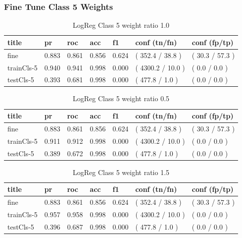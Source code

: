 \documentclass[ms]{nuthesis}
\begin{document}
\subsubsection{Fine Tune Class 5 Weights}
\FloatBarrier
\begin{table}[H]
\centering
\begin{tabular}{|l||l||l||l||l||l||l|}\toprule
title & pr & roc & acc & f1 & conf (tn/fn) & conf (fp/tp) \\ \midrule
fine & 0.883 & 0.861 & 0.856 & 0.624 & ( 352.4 / 38.8 ) & ( 30.3 / 57.3 ) \\
trainCls-5 & 0.940 & 0.941 & 0.998 & 0.000 & ( 4300.2 / 10.0 ) & ( 0.0 / 0.0 ) \\
testCls-5 & 0.393 & 0.681 & 0.998 & 0.000 & ( 477.8 / 1.0 ) & ( 0.0 / 0.0 ) \\ \bottomrule
\end{tabular}
\caption{LogReg Class 5 weight ratio 1.0}
\label{tab:LogRegCls5-Wt1}
\end{table}
\FloatBarrier


\FloatBarrier
\begin{table}[H]
\centering
\begin{tabular}{|l||l||l||l||l||l||l|}\toprule
title & pr & roc & acc & f1 & conf (tn/fn) & conf (fp/tp) \\ \midrule
fine & 0.883 & 0.861 & 0.856 & 0.624 & ( 352.4 / 38.8 ) & ( 30.3 / 57.3 ) \\
trainCls-5 & 0.911 & 0.912 & 0.998 & 0.000 & ( 4300.2 / 10.0 ) & ( 0.0 / 0.0 ) \\
testCls-5 & 0.389 & 0.672 & 0.998 & 0.000 & ( 477.8 / 1.0 ) & ( 0.0 / 0.0 ) \\ \bottomrule
\end{tabular}
\caption{LogReg Class 5 weight ratio 0.5}
\label{tab:LogRegCls5-Wtp5}
\end{table}
\FloatBarrier


\FloatBarrier
\begin{table}[H]
\centering
\begin{tabular}{|l||l||l||l||l||l||l|}\toprule
title & pr & roc & acc & f1 & conf (tn/fn) & conf (fp/tp) \\ \midrule
fine & 0.883 & 0.861 & 0.856 & 0.624 & ( 352.4 / 38.8 ) & ( 30.3 / 57.3 ) \\
trainCls-5 & 0.957 & 0.958 & 0.998 & 0.000 & ( 4300.2 / 10.0 ) & ( 0.0 / 0.0 ) \\
testCls-5 & 0.396 & 0.687 & 0.998 & 0.000 & ( 477.8 / 1.0 ) & ( 0.0 / 0.0 ) \\ \bottomrule
\end{tabular}
\caption{LogReg Class 5 weight ratio 1.5}
\label{tab:LogRegCls5-Wt1p5}
\end{table}
\FloatBarrier
\end{document}
